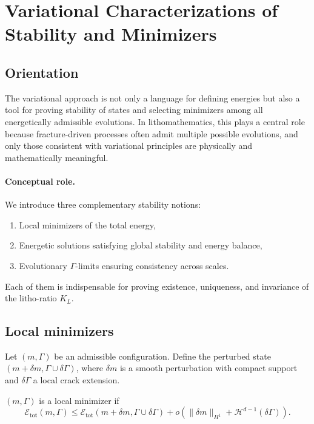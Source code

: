 \section{Variational Characterizations of Stability and Minimizers}\label{sec:var-stability}

\subsection{Orientation}
The variational approach is not only a language for defining energies but also a tool 
for proving stability of states and selecting minimizers among all energetically 
admissible evolutions. In lithomathematics, this plays a central role because 
fracture-driven processes often admit multiple possible evolutions, 
and only those consistent with variational principles are physically and mathematically meaningful.

\paragraph{Conceptual role.}
We introduce three complementary stability notions:
\begin{enumerate}[label=(\roman*)]
  \item Local minimizers of the total energy,
  \item Energetic solutions satisfying global stability and energy balance,
  \item Evolutionary $\Gamma$-limits ensuring consistency across scales.
\end{enumerate}
Each of them is indispensable for proving existence, uniqueness, and invariance of the litho-ratio $K_L$.

\subsection{Local minimizers}
Let $(m,\Gamma)$ be an admissible configuration.  
Define the perturbed state $(m+\delta m,\Gamma\cup\delta\Gamma)$, where $\delta m$ is a smooth perturbation with compact support and $\delta\Gamma$ a local crack extension.

\begin{definition}
$(m,\Gamma)$ is a local minimizer if
\[
  \mathcal{E}_{\mathrm{tot}}(m,\Gamma) \leq 
  \mathcal{E}_{\mathrm{tot}}(m+\delta m,\Gamma\cup\delta\Gamma) + o(\|\delta m\|_{H^1} + \mathcal{H}^{d-1}(\delta\Gamma)).
\]
\end{definition}

